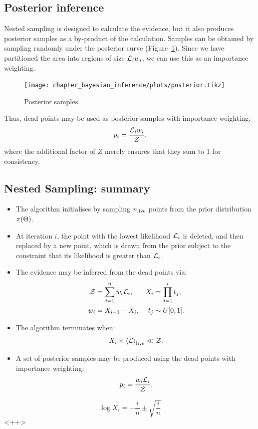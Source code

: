 \subsection{Posterior inference}
Nested sampling is designed to calculate the evidence, but it also produces posterior samples as a by-product of the calculation. Samples can be obtained by sampling randomly under the posterior curve (Figure~\ref{fig:bay:posterior}). Since we have partitioned the area into regions of size $\mathcal{L}_i w_i$, we can use this as an importance weighting.

\begin{figure}[ht]
  \centering
  \texttt{[image: chapter\_bayesian\_inference/plots/posterior.tikz]}
  \caption{%
    Posterior samples.\label{fig:bay:posterior}
}
\end{figure}

Thus, dead points may be used as posterior samples with importance weighting:
\begin{equation}
  p_i = \frac{\mathcal{L}_i w_i}{Z},
  \label{eqn:bay:posterior_weight}
\end{equation}
where the additional factor of $Z$ merely ensures that they sum to $1$ for consistency.



\subsection{Nested Sampling: summary}
\label{sec:bay:comp_space}
\begin{itemize}
  \item The algorithm initialises by sampling $n_{\mathrm{live}}$ points from the prior distribution $\pi(\Theta)$. 
  \item At iteration $i$, the point with the lowest likelihood $\mathcal{L}_i$ is deleted, and then replaced by a new point, which is drawn from the prior subject to the constraint that its likelihood is greater than $\mathcal{L}_i$. 
  \item The evidence may be inferred from the dead points via:
    \begin{align}
      \mathcal{Z} &= \sum_{i=1}^n w_i \mathcal{L}_i, &
      X_i &= \prod_{j=1}^{i} t_j, \nonumber \\
      w_i &= X_{i-1}-X_{i},  & 
      t_j &\sim U[0,1].\nonumber 
    \end{align}
  \item The algorithm terminates when:
    \begin{equation}
      X_i \times {\left\langle{\mathcal{L}}\right\rangle}_{\mathrm{live}} \ll \mathcal{Z}.
    \end{equation}
  \item A set of posterior samples may be produced using the dead points with importance weighting:
    \begin{equation}
      p_i = \frac{w_i\mathcal{L}_i}{\mathcal{Z}}.\nonumber
    \end{equation}

\end{itemize}

\begin{equation}
  \log X_i = -\frac{i}{n} \pm \sqrt{\frac{i}{n}}
  \label{eqn:pc:X_full}
\end{equation}<++>




